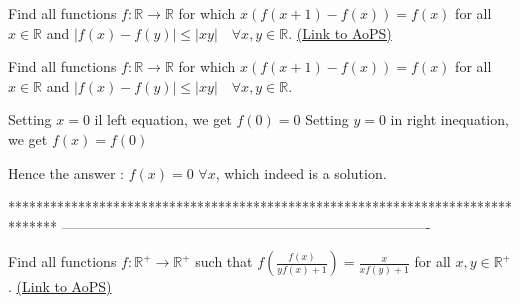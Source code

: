 \begin{problem}
	Find all functions $f: \mathbb R\to  \mathbb R$ for which $x (f (x +1) - f (x)) = f (x)$ for all $x \in\mathbb R$ and $\left | f (x) - f (y) \right| \leq  \left | xy \right | \quad \forall x, y \in\mathbb R$.
	\flushright \href{https://artofproblemsolving.com/community/c6h567604}{(Link to AoPS)}
\end{problem}



\begin{solution}
	\begin{tcolorbox}Find all functions $f: \mathbb R\to  \mathbb R$ for which $x (f (x +1) - f (x)) = f (x)$ for all $x \in\mathbb R$ and $\left | f (x) - f (y) \right| \leq  \left | xy \right | \quad \forall x, y \in\mathbb R$.\end{tcolorbox}
Setting $x=0$ il left equation, we get $f(0)=0$
Setting $y=0$ in right inequation, we get $f(x)=f(0)$

Hence the answer : $\boxed{f(x)=0}$ $\forall x$, which indeed is a solution.
\end{solution}
*******************************************************************************
-------------------------------------------------------------------------------

\begin{problem}
	Find all functions $f: \mathbb{R}^{+} \to \mathbb{R}^{+}$ such that $ \displaystyle f\left (\frac{f(x)}{yf(x)+1} \right )=\frac{x}{xf(y)+1} $ for all $x,y\in \mathbb{R}^{+}$.
	\flushright \href{https://artofproblemsolving.com/community/c6h567755}{(Link to AoPS)}
\end{problem}



